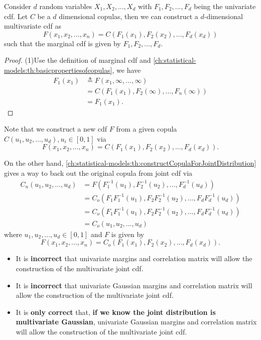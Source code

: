 \begin{refsection}
\begin{theorem}\label{ch:statistical-models:th:ConstructMultivariateDistributionFromCopulaAndMargins}
	Consider $d$ random variables $X_1,X_2,...,X_d$ with $F_1,F_2,...,F_d$ being the univariate cdf. Let $C$ be a $d$ dimensional copulas, then we can construct a $d$-dimensional multivariate cdf as
	$$F(x_1,x_2,...,x_n) = C(F_1(x_1),F_2(x_2),...,F_d(x_d))$$
	such that the marginal cdf is given by $F_1,F_2,...,F_d$.
\end{theorem}
\begin{proof}
(1)Use the definition of marginal cdf and \autoref{ch:statistical-models:th:basicpropertiesofcopulas}, we have
\begin{align*}
F_1(x_1) &\triangleq F(x_1,\infty,...,\infty) \\
&=C(F_1(x_1),F_2(\infty),...,F_n(\infty)) \\
&=F_1(x_1).
\end{align*}
\end{proof}

\begin{remark}
Note that we construct a new cdf $F$ from a given copula $C(u_1,u_2,...,u_d),u_i\in [0,1]$ via
$$F(x_1,x_2,...,x_n) = C(F_1(x_1),F_2(x_2),...,F_d(x_d)).$$

On the other hand, \autoref{ch:statistical-models:th:constructCopulaForJointDistribution} gives a way to back out the original copula from joint cdf via
\begin{align*}
C_n(u_1,u_2,...,u_d) &= F(F_1^{-1}(u_1),F_2^{-1}(u_2),..., F_d^{-1}(u_d)) \\
&=C_o(F_1F_1^{-1}(u_1),F_2F_2^{-1}(u_2),..., F_dF_d^{-1}(u_d)) \\
&=C_o(F_1F_1^{-1}(u_1),F_2F_2^{-1}(u_2),..., F_dF_d^{-1}(u_d)) \\
&=C_o(u_1,u_2,...,u_d)
\end{align*}
where $u_1,u_2,...,u_d\in [0,1]$ and 
$F$ is given by
$$F(x_1,x_2,...,x_n) = C_o(F_1(x_1),F_2(x_2),...,F_d(x_d)).$$	
\end{remark}

\begin{note}[caution!]\hfill
\begin{itemize}
	\item It is \textbf{incorrect} that univariate margins and correlation matrix will allow the construction of the multivariate joint cdf.
	\item It is \textbf{incorrect} that univariate Gaussian margins and correlation matrix will allow the construction of the multivariate joint cdf.
	\item It is \textbf{only correct} that, \textbf{if we know the joint distribution is multivariate Gaussian}, univariate Gaussian margins and correlation matrix will allow the construction of the multivariate joint cdf.
\end{itemize}	
\end{note}






\end{refsection}
